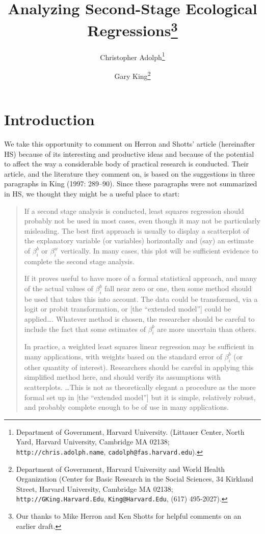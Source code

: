 \documentclass[11pt,titlepage]{article}
\title{Analyzing Second-Stage Ecological Regressions\thanks{Our thanks
    to Mike Herron and Ken Shotts for helpful comments on an earlier
    draft.}}
\author{Christopher Adolph\thanks{Department of Government, Harvard
    University. (Littauer Center, North Yard, Harvard University,
    Cambridge MA 02138; \texttt{http://chris.adolph.name},
    \texttt{cadolph@fas.harvard.edu}).}
\and %
Gary King\thanks{Department of Government, Harvard University and
  World Health Organization (Center for Basic Research in the Social
  Sciences, 34 Kirkland Street, Harvard University, Cambridge MA
  02138; \texttt{http://GKing.Harvard.Edu}, \texttt{King@Harvard.Edu},
  (617) 495-2027).}  }
\begin{document}
\maketitle

\section{Introduction}

We take this opportunity to comment on Herron and Shotts' article
(hereinafter HS) because of its interesting and productive ideas and
because of the potential to affect the way a considerable body of
practical research is conducted.  Their article, and the literature
they comment on, is based on the suggestions in three paragraphs in
King (1997: 289--90).  Since these paragraphs were not summarized in
HS, we thought they might be a useful place to start:
\begin{quotation}
  If a second stage analysis is conducted, least squares regression
  should probably not be used in most cases, even though it may not be
  particularly misleading.  The best first approach is usually to
  display a scatterplot of the explanatory variable (or variables)
  horizontally and (say) an estimate of $\beta_i^b$ or $\beta_i^w$
  vertically.  In many cases, this plot will be sufficient evidence to
  complete the second stage analysis.
  
  If it proves useful to have more of a formal statistical approach,
  and many of the actual values of $\beta_i^b$ fall near zero or one,
  then some method should be used that takes this into account.  The
  data could be transformed, via a logit or probit transformation, or
  [the ``extended model''] could be applied\ldots.  Whatever method is
  chosen, the researcher should be careful to include the fact that
  some estimates of $\beta_i^b$ are more uncertain than others.
    
  In practice, a weighted least squares linear regression may be
  sufficient in many applications, with weights based on the standard
  error of $\beta_i^b$ (or other quantity of interest).  Researchers
  should be careful in applying this simplified method here, and
  should verify its assumptions with scatterplots. \ldots This is not
  as theoretically elegant a procedure as the more formal set up in
  [the ``extended model''] but it is simple, relatively robust, and
  probably complete enough to be of use in many applications.
\end{quotation}  
\end{document}
